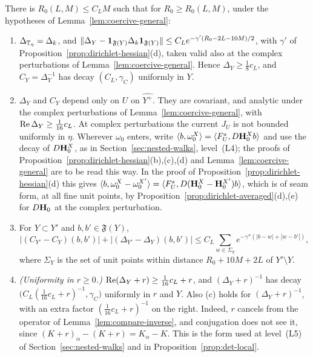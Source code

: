 \begin{proposition}\label{prop:local-fluct}
There is $R_0(L,M)\le C_LM$ such that for $R_0\ge R_0(L,M)$, under the hypotheses of Lemma~\ref{lem:coercive-general}:
\begin{enumerate}[label=(\alph*)]
\item $\Delta_{\mathbb T_\eta}=\Delta_k$, and $\|\Delta_Y-\mathbf 1_{\mathfrak F(Y)}\Delta_k\mathbf 1_{\mathfrak F(Y)}\|\le C_Le^{-\gamma'(R_0-2L-10M)/2}$, with $\gamma'$ of Proposition~\ref{prop:dirichlet-hessian}(d), taken valid also at the complex perturbations of Lemma~\ref{lem:coercive-general}. Hence $\Delta_Y\ge\frac18c_L$, and $C_Y=\Delta_Y^{-1}$ has decay $(C_L,\gamma_C)$ uniformly in $Y$.
\item $\Delta_Y$ and $C_Y$ depend only on $U$ on $\widehat{Y^+}$. They are covariant, and analytic under the complex perturbations of Lemma~\ref{lem:coercive-general}, with $\operatorname{Re}\Delta_Y\ge\frac1{16}c_L$. At complex perturbations the current $J_U$ is not bounded uniformly in $\eta$. Wherever $\omega_0$ enters, write $\langle b,\omega_0^X\rangle=\langle F^s_U,D\mathbf H_0^Xb\rangle$ and use the decay of $D\mathbf H_0^X$, as in Section~\ref{sec:nested-walks}, level~(L4); the proofs of Proposition~\ref{prop:dirichlet-hessian}(b),(c),(d) and Lemma~\ref{lem:coercive-general} are to be read this way. In the proof of Proposition~\ref{prop:dirichlet-hessian}(d) this gives $\langle b,\omega_0^X-\omega_0^{X'}\rangle=\langle F^s_U,D(\mathbf H_0^X-\mathbf H_0^{X'})b\rangle$, which is of seam form, at all fine unit points, by Proposition~\ref{prop:dirichlet-averaged}(d),(e) for $D\mathbf H_0$ at the complex perturbation.
\item For $Y\subset Y'$ and $b,b'\in\mathfrak F(Y)$,
\[
|(C_{Y'}-C_Y)(b,b')|+|(\Delta_{Y'}-\Delta_Y)(b,b')|\le C_L\sum_{w\in\Sigma_Y}e^{-\gamma''(|b-w|+|w-b'|)},
\]
where $\Sigma_Y$ is the set of unit points within distance $R_0+10M+2L$ of $Y'\setminus Y$.
\item \emph{(Uniformity in $r\ge0$.)} $\operatorname{Re}(\Delta_Y+r)\ge\frac1{16}c_L+r$, and $(\Delta_Y+r)^{-1}$ has decay $\big(C_L(\frac1{16}c_L+r)^{-1},\gamma_C\big)$ uniformly in $r$ and $Y$. Also (c) holds for $(\Delta_Y+r)^{-1}$, with an extra factor $(\frac1{16}c_L+r)^{-1}$ on the right. Indeed, $r$ cancels from the operator of Lemma~\ref{lem:compare-inverse}, and conjugation does not see it, since $(K+r)_\alpha-(K+r)=K_\alpha-K$. This is the form used at level~(L5) of Section~\ref{sec:nested-walks} and in Proposition~\ref{prop:det-local}.
\end{enumerate}
\end{proposition}

